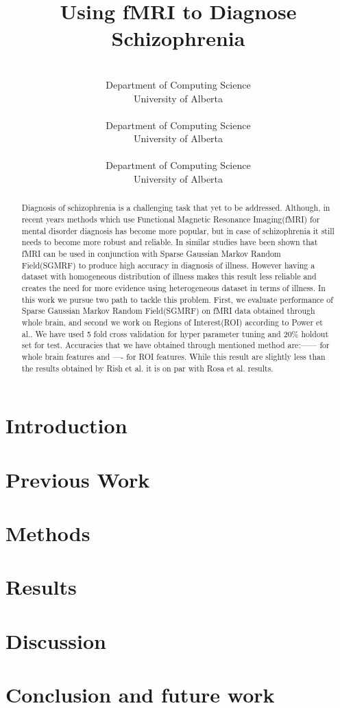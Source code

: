 \documentclass{article} %
\title{Using fMRI to Diagnose Schizophrenia}
\author{%
	\\
	Department of Computing Science\\
	University of Alberta\\
	\texttt{} 
\And 
 \\
Department of Computing Science\\
University of Alberta\\
\texttt{}
\And 
\\
Department of Computing Science\\
University of Alberta\\
\texttt{}  
}
\begin{document}
	\maketitle
	\begin{abstract}
			Diagnosis of schizophrenia is a challenging task that yet to be addressed\cite{McGuire200891}. Although, in recent years methods which use Functional Magnetic Resonance Imaging(fMRI) for mental disorder diagnosis has become more popular, but in case of schizophrenia it still needs to become more robust and reliable. In similar studies\cite{Rish_2013}\cite{Rosa_2013} have been shown that fMRI can be used in conjunction with Sparse Gaussian Markov Random Field(SGMRF) to produce high accuracy in diagnosis of illness. However having a dataset with homogeneous distribution of illness makes this result less reliable and creates the need for more evidence using heterogeneous dataset in terms of illness. In this work we pursue two path to tackle this problem. First, we evaluate performance of Sparse Gaussian Markov Random Field(SGMRF) on fMRI data obtained through whole brain, and second we work on Regions of Interest(ROI) according to Power et al.\cite{Power_2011}. We have used 5 fold cross validation for hyper parameter tuning and 20\% holdout set for test. Accuracies that we have obtained through mentioned method are:------ for whole brain features and ---- for ROI features. While this result are slightly less than the results obtained by Rish et al. it is on par with Rosa et al. results.  
	\end{abstract}
	
	\section{Introduction}\label{sec:Introduction}
	\section{Previous Work}\label{sec:Previous_Work}
	\section{Methods}\label{sec:Methods}
	\section{Results}\label{sec:Results}
	\section{Discussion}\label{sec:Discussion}
	\section{Conclusion and future work}\label{sec:Conclusion}
	
	
	
	
\end{document}

